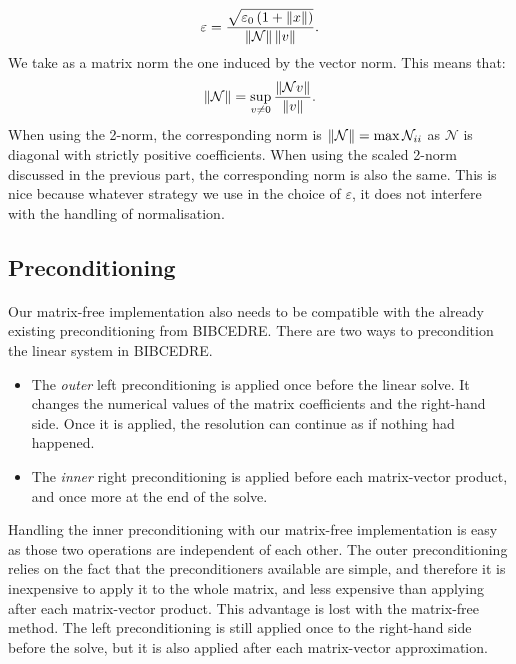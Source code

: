       \begin{equation}
        \varepsilon = \frac{\sqrt{\varepsilon_0 \left(1 + \norm{x}\right) }}{\norm{\mathcal{N}} \norm{v}} .
      \end{equation}
      We take as a matrix norm the one induced by the vector norm.
      This means that:
      \begin{equation}
        \norm{\mathcal{N}} = \sup_{v \ne 0} \frac{\norm{\mathcal{N}v}}{\norm{v}} .
      \end{equation}
      When using the 2-norm, the corresponding norm is $\norm{\mathcal{N}} = \max{\mathcal{N}_{ii}}$ as $\mathcal{N}$ is diagonal with strictly positive coefficients.
      When using the scaled 2-norm discussed in the previous part, the corresponding norm is also the same.
      This is nice because whatever strategy we use in the choice of $\varepsilon$, it does not interfere with the handling of normalisation.


    \subsection{Preconditioning}

      \paragraph{}
      Our matrix-free implementation also needs to be compatible with the already existing preconditioning from BIBCEDRE.
      There are two ways to precondition the linear system in BIBCEDRE.
      \begin{itemize}
        \item The \emph{outer} left preconditioning is applied once before the linear solve.
          It changes the numerical values of the matrix coefficients and the right-hand side.
          Once it is applied, the resolution can continue as if nothing had happened.
        \item The \emph{inner} right preconditioning is applied before each matrix-vector product, and once more at the end of the solve.
      \end{itemize}
      Handling the inner preconditioning with our matrix-free implementation is easy as those two operations are independent of each other.
      The outer preconditioning relies on the fact that the preconditioners available are simple, and therefore it is inexpensive to apply it to the whole matrix, and less expensive than applying after each matrix-vector product.
      This advantage is lost with the matrix-free method.
      The left preconditioning is still applied once to the right-hand side before the solve, but it is also applied after each matrix-vector approximation.



